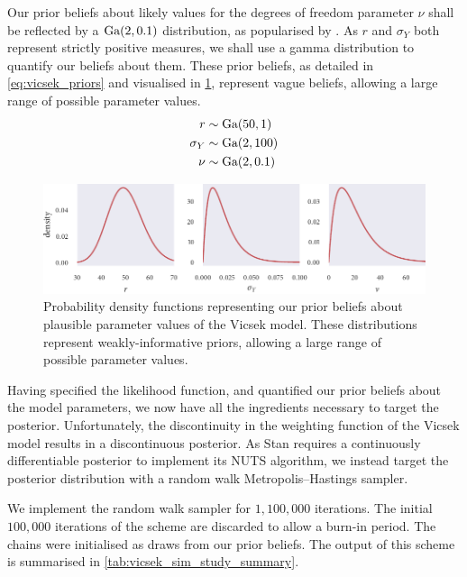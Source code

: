 Our prior beliefs about likely values for the degrees of freedom parameter $\nu$ shall be
reflected by a $\textrm{Ga}(2, 0.1)$ distribution, as popularised by \textcite{juarez10}.  As $r$
and $\sigma_Y$ both represent strictly positive measures, we shall use a gamma
distribution to quantify our beliefs about them. These prior beliefs, as detailed in
\cref{eq:vicsek_priors} and visualised in \cref{fig:vicsek_priors}, represent vague
beliefs, allowing a large range of possible parameter values.
\begin{align}
    \label{eq:vicsek_priors}
    \begin{split}
        r           & \sim \textrm{Ga}(50, 1) \\
        \sigma_Y    & \sim \textrm{Ga}(2, 100)\\
        \nu         & \sim \textrm{Ga}(2, 0.1)
    \end{split}
\end{align}
\begin{figure}[tb]
    \includegraphics{vicsek_priors.pdf}
    \caption{Probability density functions representing our prior beliefs about plausible
    parameter values of the Vicsek model. These distributions represent
    weakly-informative priors, allowing a large range of possible parameter values.}
    \label{fig:vicsek_priors}
\end{figure}

Having specified the likelihood function, and quantified our prior beliefs about the model
parameters, we now have all the ingredients necessary to target the posterior.
Unfortunately, the discontinuity in the weighting function of the Vicsek model results in
a discontinuous posterior. As Stan requires a continuously differentiable posterior to
implement its NUTS algorithm, we instead target the posterior distribution with a random
walk Metropolis--Hastings sampler.

We implement the random walk sampler for $1,100,000$ iterations. The initial $100,000$
iterations of the scheme are discarded to allow a burn-in period. The chains were
initialised as draws from our prior beliefs. The output of this scheme is summarised in
\cref{tab:vicsek_sim_study_summary}.


